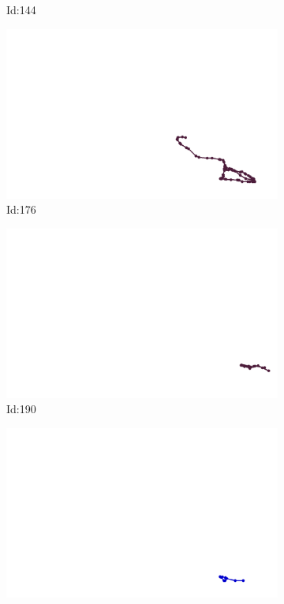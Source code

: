 \documentclass[12pt,twoside]{report}
\begin{document}
\begin{figure}
\begin{subfigure}[b]{0.20\textwidth}
\caption{Id:144}
\end{subfigure}
\begin{subfigure}[b]{0.20\textwidth}
\centering
\includegraphics[width=\textwidth]{../trajectories/176.png}
\caption{Id:176}
\end{subfigure}
\begin{subfigure}[b]{0.20\textwidth}
\centering
\includegraphics[width=\textwidth]{../trajectories/190.png}
\caption{Id:190}
\end{subfigure}
\begin{subfigure}[b]{0.20\textwidth}
\centering
\includegraphics[width=\textwidth]{../trajectories/214.png}

\end{subfigure}
\end{figure}
\end{document}
